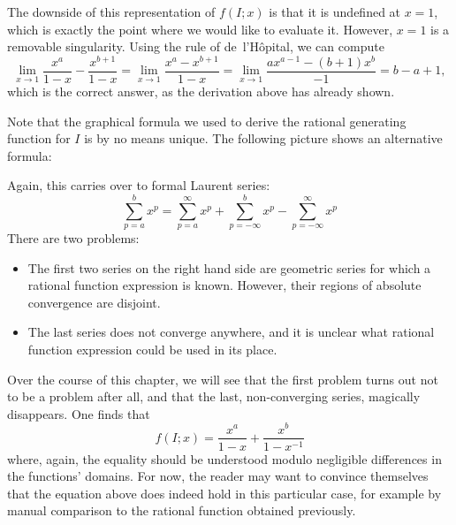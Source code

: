 The downside of this representation of $f(I;x)$ is that it is undefined at $x = 1$,
which is exactly the point where we would like to evaluate it.
However, $x = 1$ is a removable singularity.
Using the rule of de~l'Hôpital, we can compute
\[
  \lim_{x \to 1} \frac{x^a}{1 - x} - \frac{x^{b + 1}}{1 - x} = \lim_{x \to 1} \frac{x^a - x^{b+1}}{1 - x} = \lim_{x \to 1} \frac{a x^{a-1} - (b+1) x^b}{-1} = b - a + 1,
\]
which is the correct answer, as the derivation above has already shown.

Note that the graphical formula we used to derive the rational generating function for $I$ is by no means unique.
The following picture shows an alternative formula:
\begin{center}
\end{center}
Again, this carries over to formal Laurent series:
\[
  \sum_{p = a}^b x^p = \sum_{p = a}^\infty x^p + \sum_{p = -\infty}^b x^p - \sum_{p = -\infty}^\infty x^p
\]
There are two problems:
\begin{itemize}
  \item The first two series on the right hand side are geometric series for which a rational function expression is known.
    However, their regions of absolute convergence are disjoint.
  
  \item The last series does not converge anywhere, and it is unclear what rational function expression could be used in its place.
\end{itemize}
Over the course of this chapter,
we will see that the first problem turns out not to be a problem after all,
and that the last, non-converging series, magically disappears.
One finds that
\[
  f(I;x) = \frac{x^a}{1-x} + \frac{x^b}{1-x^{-1}}
\]
where, again, the equality should be understood modulo negligible differences in the functions' domains.
For now, the reader may want to convince themselves that the equation above does indeed hold in this particular case,
for example by manual comparison to the rational function obtained previously.

